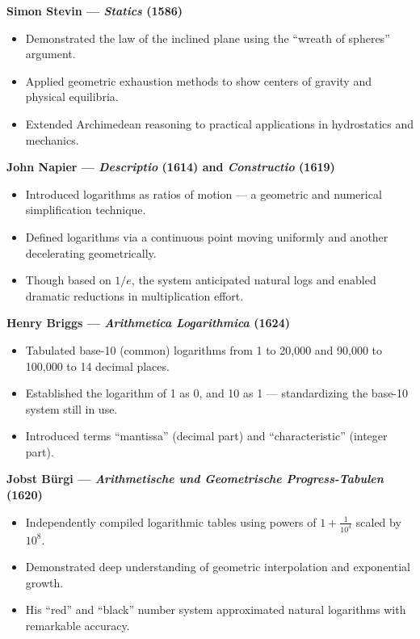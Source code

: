 \documentclass[9pt]{article}
\begin{document}
\textbf{Simon Stevin — \textit{Statics} (1586)}

\begin{itemize}
    \item Demonstrated the law of the inclined plane using the “wreath of spheres” argument.
    \item Applied geometric exhaustion methods to show centers of gravity and physical equilibria.
    \item Extended Archimedean reasoning to practical applications in hydrostatics and mechanics.
\end{itemize}

\textbf{John Napier — \textit{Descriptio} (1614) and \textit{Constructio} (1619)}

\begin{itemize}
    \item Introduced logarithms as ratios of motion — a geometric and numerical simplification technique.
    \item Defined logarithms via a continuous point moving uniformly and another decelerating geometrically.
    \item Though based on $1/e$, the system anticipated natural logs and enabled dramatic reductions in multiplication effort.
\end{itemize}

\textbf{Henry Briggs — \textit{Arithmetica Logarithmica} (1624)}

\begin{itemize}
    \item Tabulated base-10 (common) logarithms from 1 to 20,000 and 90,000 to 100,000 to 14 decimal places.
    \item Established the logarithm of 1 as 0, and 10 as 1 — standardizing the base-10 system still in use.
    \item Introduced terms “mantissa” (decimal part) and “characteristic” (integer part).
\end{itemize}

\textbf{Jobst Bürgi — \textit{Arithmetische und Geometrische Progress-Tabulen} (1620)}

\begin{itemize}
    \item Independently compiled logarithmic tables using powers of $1 + \tfrac{1}{10^4}$ scaled by $10^8$.
    \item Demonstrated deep understanding of geometric interpolation and exponential growth.
    \item His “red” and “black” number system approximated natural logarithms with remarkable accuracy.
\end{itemize}
\end{document}
